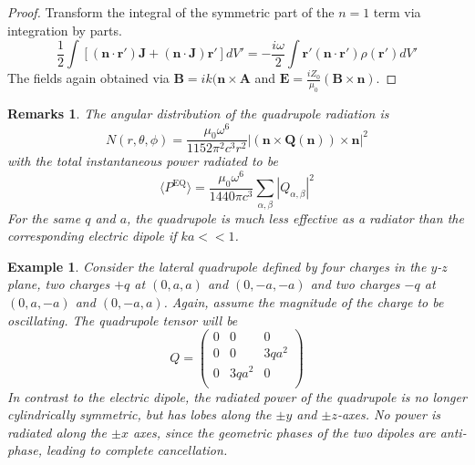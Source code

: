 \documentclass[a4paper]{article}
\newtheorem{remarks}{Remarks}[section]
\newtheorem{eg}{Example}[section]
\theoremstyle{new}
\begin{document}
\begin{proof}
Transform the integral of the symmetric part of the $n=1$ term via integration by parts.
$$\frac{1}{2}\int[(\mathbf{n}\cdot\mathbf{r'})\mathbf{J}+(\mathbf{n}\cdot\mathbf{J})\mathbf{r'}]dV'=-\frac{i\omega}{2}\int\mathbf{r'}(\mathbf{n}\cdot\mathbf{r'})\rho(\mathbf{r'})dV'$$
The fields again obtained via $\mathbf{B}=ik(\mathbf{n}\times\mathbf{A}$ and $\mathbf{E}=\frac{iZ_0}{\mu_0}(\mathbf{B}\times\mathbf{n})$.
\end{proof}
\begin{remarks}
The angular distribution of the quadrupole radiation is
$$N(r,\theta,\phi)=\frac{\mu_0\omega^6}{1152\pi^2c^3r^2}|(\mathbf{n}\times\mathbf{Q}(\mathbf{n}))\times\mathbf{n}|^2$$
with the total instantaneous power radiated to be
$$\langle P^{\text{EQ}}\rangle=\frac{\mu_0\omega^6}{1440\pi c^3}\sum_{\alpha,\beta}|Q_{\alpha,\beta}|^2$$
For the same $q$ and $a$, the quadrupole is much less effective as a radiator than the corresponding electric dipole if $ka<<1$. 
\end{remarks}
\begin{eg}
Consider the lateral quadrupole defined by four charges in the $y$-$z$ plane, two charges $+q$ at $(0,a,a)$ and $(0,-a,-a)$ and two charges $-q$ at $(0,a,-a)$ and $(0,-a,a)$. Again, assume the magnitude of the charge to be oscillating. The quadrupole tensor will be
$$Q=\begin{pmatrix}0&0&0\\0&0&3qa^2\\0&3qa^2&0\\\end{pmatrix}$$
In contrast to the electric dipole, the radiated power of the quadrupole is no longer cylindrically symmetric, but has lobes along the $\pm y$ and $\pm z$-axes. No power is radiated along the $\pm x$ axes, since the geometric phases of the two dipoles are anti-phase, leading to complete cancellation.
\end{eg}
\newpage
\end{document}
